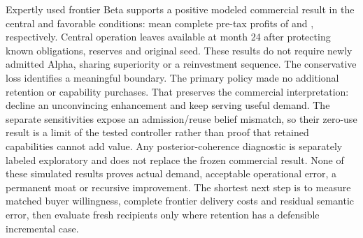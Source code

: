 Expertly used frontier Beta supports a positive modeled commercial result in the central and favorable conditions: mean complete pre-tax profits of  and , respectively. Central operation leaves  available at month 24 after protecting known obligations, reserves and original seed. These results do not require newly admitted Alpha, sharing superiority or a reinvestment sequence. The conservative loss identifies a meaningful boundary. The primary policy made no additional retention or capability purchases. That preserves the commercial interpretation: decline an unconvincing enhancement and keep serving useful demand. The separate sensitivities expose an admission/reuse belief mismatch, so their zero-use result is a limit of the tested controller rather than proof that retained capabilities cannot add value. Any posterior-coherence diagnostic is separately labeled exploratory and does not replace the frozen commercial result. None of these simulated results proves actual demand, acceptable operational error, a permanent moat or recursive improvement. The shortest next step is to measure matched buyer willingness, complete frontier delivery costs and residual semantic error, then evaluate fresh recipients only where retention has a defensible incremental case.
